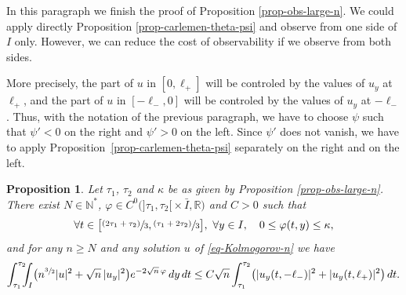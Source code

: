 \documentclass[JEP,XML,SOM,Unicode]{cedram}
\newcommand{\psfrac}[2]{\sfrac{(#1)}{#2}}
\theoremstyle{plain}
\newtheorem{proposition}[theorem]{Proposition}
\theoremstyle{definition}
\newcommand{\abs}[1]{\vert #1\vert}
\newcommand{\1}{\mathds 1}
\newcommand{\R}{\mathbb{R}}
\newcommand{\N}{\mathbb{N}}
\let\k\kappa
\let\f\varphi
\begin{document}
In this paragraph we finish the proof of Proposition \ref{prop-obs-large-n}.
We could apply directly Proposition \ref{prop-carlemen-theta-psi} and observe from one side of $I$ only. However, we can reduce the cost of observability if we observe from both sides.

More precisely, the part of $u$ in $[0,\ell_+]$ will be controled by the values of $u_y$ at $\ell_+$, and the part of $u$ in $[-\ell_-,0]$ will be controled by the values of $u_y$ at $-\ell_-$. Thus, with the notation of the previous paragraph, we have to choose $\psi$ such that $\psi' < 0$ on the right and $\psi' > 0$ on the left. Since $\psi'$ does not vanish, we have to apply Proposition~\ref{prop-carlemen-theta-psi} separately on the right and on the left.

\begin{proposition} \label{prop-def-phi}
Let $\tau_1$, $\tau_2$ and $\kappa$ be as given by Proposition \ref{prop-obs-large-n}. There exist $N \in \N^*$, $\f \in C^0 \bigl(]\tau_1,\tau_2[{}\times \bar I,\R \bigr)$ and $C > 0$ such that
\begin{equation} \label{eq-phi}
\forall t \in \bigl[ \psfrac {2\tau_1 + \tau_2} 3 , \psfrac {\tau_1 + 2 \tau_2}{3} \bigr],\ \forall y \in I, \quad 0 \leq \f(t,y) \leq \k,
\end{equation}
and for any $n \geq N$ and any solution $u$ of \eqref{eq-Kolmogorov-n} we have
\[
\int_{\tau_1}^{\tau_2}\hspace*{-2mm} \int_{I} \bigl(n^{\sfrac 32} \abs u^2 + \sqrt n\,\abs{u_y}^2 \bigr) e^{-2\sqrt n\,\f} \, dy \, dt \leq C \sqrt n \int_{\tau_1}^{\tau_2} \bigl(\abs{u_y(t,-\ell_-)}^2 + \abs{u_y(t,\ell_+)}^2\bigr) \, dt.
\]
\end{proposition}
\end{document}
